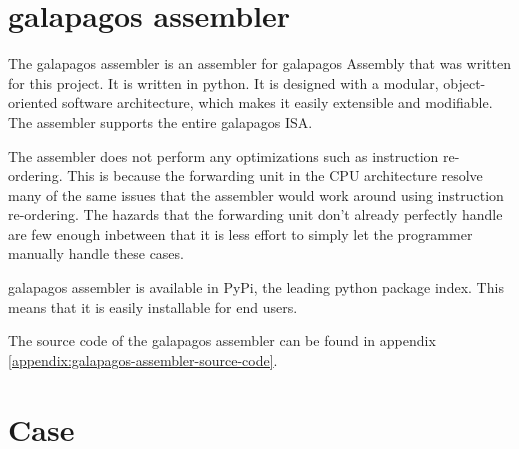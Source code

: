 \section{\Gls{galapagos assembler}}

The \Gls{galapagos assembler} is an assembler for \Gls{galapagos} Assembly that was written for this project.
It is written in python. 
It is designed with a modular, object-oriented software architecture, which makes it easily extensible and modifiable.
The assembler supports the entire \Gls{galapagos} ISA.

The assembler does not perform any optimizations such as instruction re-ordering.
This is because the forwarding unit in the CPU architecture resolve many of the same issues that the assembler would work around using instruction re-ordering.
The hazards that the forwarding unit don't already perfectly handle are few enough inbetween that it is less effort to simply let the programmer manually handle these cases.

\Gls{galapagos assembler} is available in PyPi, the leading python package index.
This means that it is easily installable for end users.

The source code of the \Gls{galapagos assembler} can be found in appendix \vref{appendix:galapagos-assembler-source-code}.

\section{Case}

